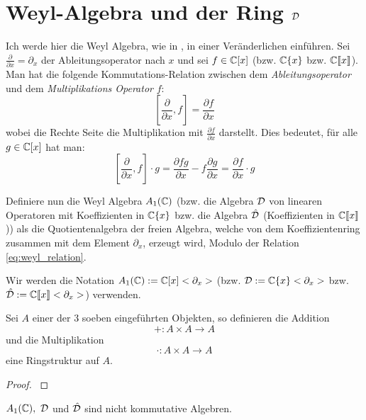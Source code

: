 \section{Weyl-Algebra und der Ring $\mathcal{D}$} 
Ich werde hier die Weyl Algebra, wie in
\cite[Chapter~1]{sabbah_cimpa90}, in einer Veränderlichen einführen.
Sei $\frac{\partial}{\partial x}=\partial_x$ der Ableitungsoperator nach $x$
und sei $f \in\mathbb{C}[x]$ (bzw. $\mathbb{C}\{x\}$ bzw. $\mathbb{C}\llbracket x\rrbracket$).
Man hat die folgende Kommutations-Relation zwischen dem
\emph{Ableitungsoperator}
und dem \emph{Multiplikations Operator} $f$:
\begin{equation}\label{eq:weyl_relation}
  [\frac{\partial}{\partial x},f]=\frac{\partial f}{\partial x}
\end{equation}
wobei die Rechte Seite die Multiplikation mit $\frac{\partial f}{\partial x}$
darstellt. Dies bedeutet, für alle $g\in\mathbb{C}[x]$ hat man:
\[
  [\frac{\partial}{\partial x},f]\cdot g
  =\frac{\partial fg}{\partial x} - f\frac{\partial g}{\partial x}
  =\frac{\partial f}{\partial x} \cdot g
\]
\begin{defn}
  Definiere nun die Weyl Algebra $A_1(\mathbb{C})$ (bzw. die Algebra $\mathcal{D}$ von
  linearen Operatoren mit Koeffizienten in $\mathbb{C}\{x\}$ bzw. die Algebra
  $\hat{\mathcal{D}}$ (Koeffizienten in $\mathbb{C}\llbracket x\rrbracket$)) als die
  Quotientenalgebra der freien Algebra, welche von dem Koeffizientenring
  zusammen mit dem Element $\partial_x$, erzeugt wird, Modulo der Relation
  \eqref{eq:weyl_relation}.
\end{defn}
Wir werden die Notation $A_1(\mathbb{C}):=\mathbb{C}[x]<\partial_x>$ (bzw.
$\mathcal{D}:=\mathbb{C}\{x\}<\partial_x>$ bzw. 
$\hat{\mathcal{D}}:=\mathbb{C}\llbracket x\rrbracket<\partial_x>$) verwenden.

\begin{lem} %
  Sei $A$ einer der 3 soeben eingeführten Objekten, so definieren die Addition 
  \[
    +:A\times A \rightarrow A
  \]
  und die Multiplikation
  \[
    \cdot:A\times A \rightarrow A
  \]
  eine Ringstruktur auf $A$.
\end{lem}
\begin{proof}
  \cite[Kapittel 2 Section 1]{ZulaBarbara}
\end{proof}

\begin{rem}
  $A_1(\mathbb{C}),~\mathcal{D}$ und $\hat{\mathcal{D}}$ sind nicht kommutative Algebren.
\end{rem}

